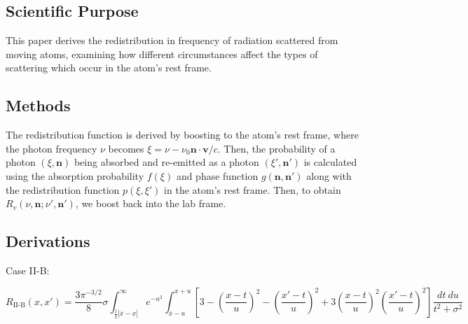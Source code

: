 \documentclass[onecolumn]{aastex63}
\begin{document}


\subsection{Scientific Purpose}

This paper derives the redistribution in frequency of radiation scattered from moving atoms, examining how different circumstances affect the types of scattering which occur in the atom's rest frame. 

\subsection{Methods}

The redistribution function is derived by boosting to the atom's rest frame, where the photon frequency $\nu$ becomes $\xi = \nu - \nu_0 \mathbf{n}\cdot \mathbf{v}/c$. Then, the probability of a photon $(\xi, \mathbf{n})$ being absorbed and re-emitted as a photon $(\xi', \mathbf{n}')$ is calculated using the absorption probability $f(\xi)$ and phase function $g(\mathbf{n}, \mathbf{n}')$ along with the redistribution function $p(\xi, \xi')$ in the atom's rest frame. Then, to obtain $R_v(\nu, \mathbf{n}; \nu', \mathbf{n}')$, we boost back into the lab frame.

\subsection{Derivations}

Case II-B:

\begin{equation}
    R_{\textrm{II-B}}(x, x') = \frac{3\pi^{-3/2}}{8}\sigma \int_{\frac{1}{2}|\bar{x} - \underset{\bar{}}{x}|}^{\infty} e^{-u^2}
    \int_{\bar{x}-u}^{\underset{\bar{}}{x}+u}\left[3 - \left(\frac{x-t}{u}\right)^2 - \left(\frac{x'-t}{u}\right)^2 + 3\left(\frac{x-t}{u}\right)^2\left(\frac{x'-t}{u}\right)^2\right]\frac{dt\ du}{t^2 + \sigma^2}
\end{equation}
\end{document}
